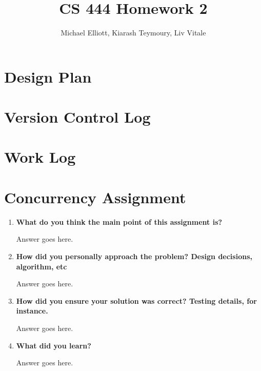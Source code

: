 \documentclass[letterpaper,10pt,titlepage,draftclsnofoot,onecolumn]{IEEEtran}
\title{CS 444 Homework 2}
\author{Michael Elliott, Kiarash Teymoury, Liv Vitale}
\begin{document}
\section{Design Plan}


\section{Version Control Log}


\section{Work Log}


\section{Concurrency Assignment}
\begin{enumerate}
\item \textbf{What do you think the main point of this assignment is?}

Answer goes here.

\item \textbf{How did you personally approach the problem? Design decisions, algorithm, etc}

Answer goes here.

\item \textbf{How did you ensure your solution was correct? Testing details, for instance.}

Answer goes here.

\item \textbf{What did you learn?}

Answer goes here.

\end{enumerate}

\nocite{*}



\end{document}
